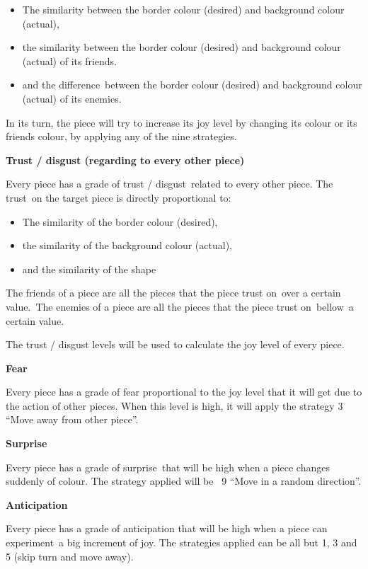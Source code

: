 \documentclass[a4paper]{article}
\newcommand\textstyleStrongEmphasis[1]{\textbf{#1}}
\newcommand\liststyleLxv{%
\renewcommand\labelitemi{{\textbullet}}
\renewcommand\labelitemii{{\textbullet}}
\renewcommand\labelitemiii{{\textbullet}}
\renewcommand\labelitemiv{{\textbullet}}
}
\newcommand\liststyleLxvi{%
\renewcommand\labelitemi{{\textbullet}}
\renewcommand\labelitemii{{\textbullet}}
\renewcommand\labelitemiii{{\textbullet}}
\renewcommand\labelitemiv{{\textbullet}}
}
\begin{document}
\liststyleLxv
\begin{itemize}
\item The similarity between the border colour (desired) and background
colour (actual), 
\item the similarity between the border colour (desired) and background
colour (actual) of its friends. 
\item and the difference~between the border colour (desired) and
background colour (actual) of its enemies. 
\end{itemize}
In its turn, the piece will try to increase its joy level by changing
its colour or its friends colour, by applying any of the nine
strategies.

\textstyleStrongEmphasis{Trust / disgust (regarding to every other
piece)}

Every piece has a grade of trust / disgust~related to every other piece.
The trust~on the target piece is directly proportional to:

\liststyleLxvi
\begin{itemize}
\item The similarity of the border colour (desired), 
\item the similarity of the background colour (actual), 
\item and the similarity of the shape 
\end{itemize}
The friends of a piece are all the pieces that the piece trust on~over a
certain value.~The enemies of a piece are all the pieces that the piece
trust on~bellow~a certain value.

The trust / disgust levels will be used to calculate the joy level of
every piece.

\textstyleStrongEmphasis{Fear}

Every piece has a grade of fear proportional to the joy level that it
will get due to the action of other pieces. When this level is high, it
will apply the strategy 3 {\textquotedblleft}Move away from other
piece{\textquotedblright}.

\textstyleStrongEmphasis{Surprise}

Every piece has a grade of surprise~that will be high when a piece
changes suddenly of colour. The strategy applied will be ~9
{\textquotedblleft}Move in a random direction{\textquotedblright}.

\textstyleStrongEmphasis{Anticipation}

Every piece has a grade of anticipation that will be high when a piece
can experiment~a big increment of joy. The strategies applied can be
all but 1, 3 and 5 (skip turn and move away).
\end{document}
